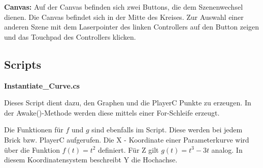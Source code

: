 \textbf{Canvas: } Auf der Canvas befinden sich zwei Buttons, die dem Szenenwechsel dienen. Die Canvas befindet sich in der Mitte des Kreises. Zur Auswahl einer anderen Szene mit dem Laserpointer des linken Controllers auf den Button zeigen und das Touchpad des Controllers klicken. 

\subsection{Scripts}
\textbf{Instantiate\_Curve.cs}

Dieses Script dient dazu, den Graphen und die PlayerC Punkte zu erzeugen. In der Awake()-Methode werden diese mittels einer For-Schleife erzeugt. 

Die Funktionen für $f$ und $g$ sind ebenfalls im Script. Diese werden bei jedem Brick bzw. PlayerC aufgerufen. Die X - Koordinate einer Parameterkurve wird über die Funktion $ f(t) = t^{2} $ definiert. Für Z gilt $g(t) = t^{3} - 3t$ analog. In diesem Koordinatensystem beschreibt Y die Hochachse.



